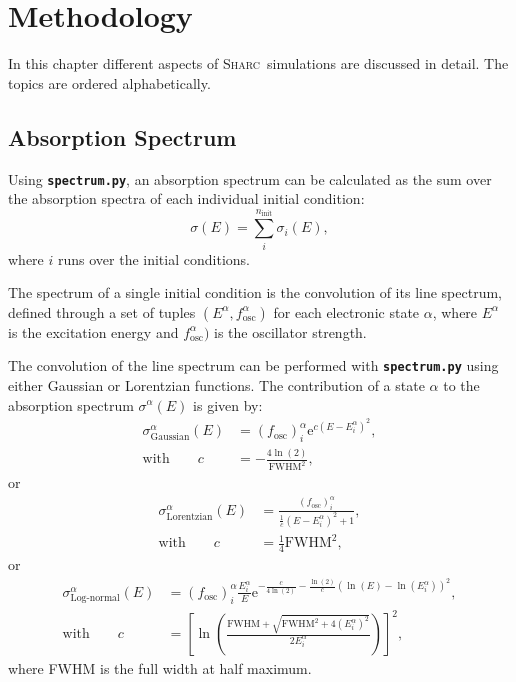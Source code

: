 \documentclass[a4paper,10pt,DIV=15,openany,twoside=false]{scrbook}
\newcommand{\sharc}{\textsc{Sharc}}
\newcommand{\ttt}[1]{\textbf{\texttt{#1}}}
\newcommand{\E}{\ensuremath{\mathrm{e}}}
\begin{document}
\chapter{Methodology}
\label{chap:met}

In this chapter different aspects of \sharc\ simulations are discussed in detail. The topics are ordered alphabetically.


\section{Absorption Spectrum}\label{met:spectrum}

Using \ttt{spectrum.py}, an absorption spectrum can be calculated as the sum over the absorption spectra of each individual initial condition:
\begin{equation}
  \sigma(E)=\sum\limits_i^{n_\text{init}} \sigma_i(E),
\end{equation}
where $i$ runs over the initial conditions.

The spectrum of a single initial condition is the convolution of its line spectrum, defined through a set of tuples $(E^\alpha,f_\text{osc}^\alpha)$ for each electronic state $\alpha$, where $E^\alpha$ is the excitation energy and $f_\text{osc}^\alpha)$ is the oscillator strength.

The convolution of the line spectrum can be performed with \ttt{spectrum.py} using either Gaussian or Lorentzian functions. The contribution of a state $\alpha$ to the absorption spectrum $\sigma^\alpha(E)$ is given by:
\begin{align}
  \sigma_{\text{Gaussian}}^\alpha(E)&=
  \left(f_{\text{osc}}\right)_i^\alpha 
  \E^{c\left(E-E_i^\alpha\right)^2},\\
  \text{with}\qquad
  c&=-\frac{4\ln(2)}{\text{FWHM}^2},
\end{align}
or
\begin{align}
  \sigma_{\text{Lorentzian}}^\alpha(E)&=
  \frac{\left(f_{\text{osc}}\right)_i^\alpha}{\frac{1}{c}\left(E-E_i^\alpha\right)^2+1},\\
  \text{with}\qquad
  c&=\frac{1}{4}\text{FWHM}^2,
\end{align}
or
\begin{align}
  \sigma_{\text{Log-normal}}^\alpha(E)&=
  \left(f_{\text{osc}}\right)_i^\alpha 
  \frac{E_i^\alpha}{E}
  \E^{-\frac{c}{4\ln(2)}-\frac{\ln(2)}{c}\left(\ln(E)-\ln(E^\alpha_i)\right)^2},\\
  \text{with}\qquad
  c&=\left[\ln\left(\frac{\text{FWHM}+\sqrt{\text{FWHM}^2+4(E^\alpha_i)^2}}{2E^\alpha_i}\right)\right]^2,
\end{align}
where FWHM is the full width at half maximum.
\end{document}
